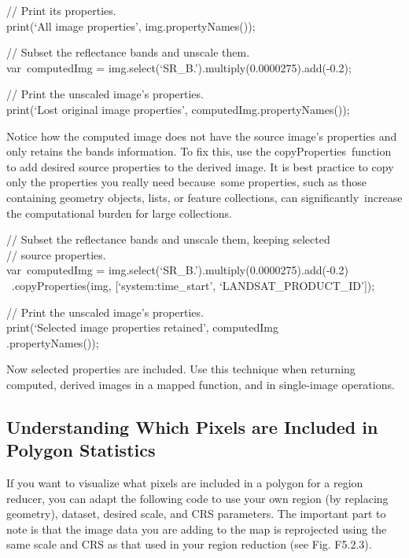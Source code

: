 \documentclass[
  letterpaper,
  DIV=11,
  numbers=noendperiod]{scrreprt}
\begin{document}
// Print its properties.\\
print(`All image properties', img.propertyNames());

// Subset the reflectance bands and unscale them.\\
var~computedImg = img.select(`SR\_B.').multiply(0.0000275).add(-0.2);

// Print the unscaled image's properties.\\
print(`Lost original image properties', computedImg.propertyNames());

Notice how the computed image does not have the source image's
properties and only retains the bands information. To fix this, use the
copyProperties~function to add desired source properties to the derived
image. It is best practice to copy only the properties you really need
because~some properties, such as those containing geometry objects,
lists, or feature collections, can significantly~increase the
computational burden for large collections.

// Subset the reflectance bands and unscale them, keeping selected\\
// source properties.\\
var~computedImg = img.select(`SR\_B.').multiply(0.0000275).add(-0.2)\\
\hspace*{0.333em} ~.copyProperties(img, {[}`system:time\_start',
`LANDSAT\_PRODUCT\_ID'{]});

// Print the unscaled image's properties.\\
print(`Selected image properties retained', computedImg\\
.propertyNames());

Now selected properties are included. Use this technique when returning
computed, derived images in a mapped function, and in single-image
operations.

\hypertarget{understanding-which-pixels-are-included-in-polygon-statistics}{%
\subsection{Understanding Which Pixels are Included in Polygon
Statistics}\label{understanding-which-pixels-are-included-in-polygon-statistics}}

If you want to visualize what pixels are included in a polygon for a
region reducer, you can adapt the following code to use your own region
(by replacing geometry), dataset, desired scale, and CRS parameters. The
important part to note is that the image data you are adding to the map
is reprojected using the same scale and CRS as that used in your region
reduction (see Fig. F5.2.3).
\end{document}
